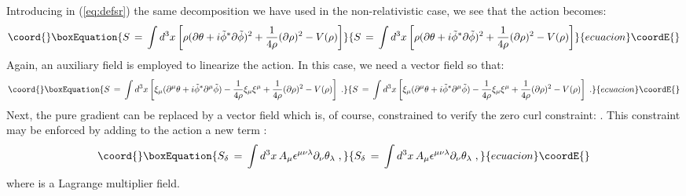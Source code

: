 \documentclass[a4paper,12pt]{article} \tolerance=200
\begin{document}
Introducing in (\ref{eq:defsr}) the same decomposition we have used in
the non-relativistic case, we see that the action \coordHE{} becomes:
\begin{equation}\coord{}\boxEquation{\label{eq:sr1}
S \,=\, \int d^3x \left[ \rho (\partial \theta + i {\tilde \phi}^*
\partial {\tilde \phi})^2   + \frac{1}{4 \rho} (\partial \rho )^2
- V(\rho) \right]
}{S \,=\, \int d^3x \left[ \rho (\partial \theta + i {\tilde \phi}^*
\partial {\tilde \phi})^2   + \frac{1}{4 \rho} (\partial \rho )^2
- V(\rho) \right]
}{ecuacion}\coordE{}\end{equation}
Again, an auxiliary field is employed to linearize the action. In this
case, we need a vector field \myHighlight{$\xi$}\coordHE{} so that:
\begin{equation}\coord{}\boxEquation{\label{eq:sr2}
S \,=\, \int d^3x \left[ \xi_\mu (\partial^\mu \theta + i {\tilde \phi}^*
\partial^\mu {\tilde \phi}) - \frac{1}{4 \rho} \xi_\mu \xi^\mu 
+\frac{1}{4\rho} (\partial \rho )^2  - V(\rho) \right] \;.
}{S \,=\, \int d^3x \left[ \xi_\mu (\partial^\mu \theta + i {\tilde \phi}^*
\partial^\mu {\tilde \phi}) - \frac{1}{4 \rho} \xi_\mu \xi^\mu 
+\frac{1}{4\rho} (\partial \rho )^2  - V(\rho) \right] \;.
}{ecuacion}\coordE{}\end{equation}
Next, the pure gradient \myHighlight{$\partial_\mu \theta$}\coordHE{} can be replaced by a 
vector field \myHighlight{$\theta_\mu \equiv \partial_\mu \theta$}\coordHE{} which is, of course,
constrained to verify the zero curl constraint: \coordHE{}. This constraint may be enforced by adding
to the action a new term \coordHE{}:
\begin{equation}\coord{}\boxEquation{\label{eq:sdelta}
S_\delta \,=\, \int d^3x \, A_\mu \epsilon^{\mu\nu\lambda} \partial_\nu \theta_\lambda \;,
}{S_\delta \,=\, \int d^3x \, A_\mu \epsilon^{\mu\nu\lambda} \partial_\nu \theta_\lambda \;,
}{ecuacion}\coordE{}\end{equation} 
where \coordHE{} is a Lagrange multiplier field.
\end{document}
